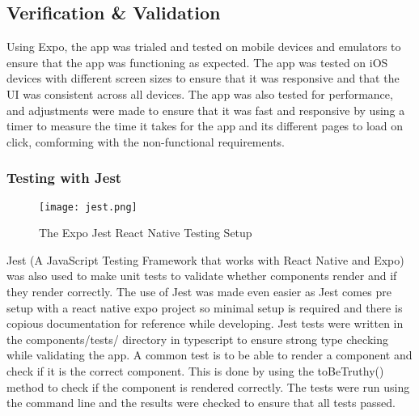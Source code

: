 \subsection{Verification \& Validation}
Using Expo, the app was trialed and tested on mobile devices and emulators to ensure that the app was functioning as expected. The app was tested on iOS devices with different screen sizes to ensure that it was responsive and that the UI was consistent across all devices. The app was also tested for performance, and adjustments were made to ensure that it was fast and responsive by using a timer to measure the time it takes for the app and its different pages to load on click, comforming with the non-functional requirements. 

\subsubsection{Testing with Jest}

\begin{figure}[h!!]
    \begin{center}
      \texttt{[image: jest.png]}
      \caption{The Expo Jest React Native Testing Setup\cite{LevelUp2025}}
      \label{figure:jest}
    \end{center}
  \end{figure}
  
Jest (A JavaScript Testing Framework that works with React Native and Expo) was also used to make unit tests to validate whether components render and if they render correctly. The use of Jest was made even easier as Jest comes pre setup with a react native expo project so minimal setup is required and there is copious documentation for reference while developing. Jest tests were written in the components/tests/ directory in typescript to ensure strong type checking while validating the app. A common test is to be able to render a component and check if it is the correct component. This is done by using the toBeTruthy() method to check if the component is rendered correctly. The tests were run using the command line and the results were checked to ensure that all tests passed.
